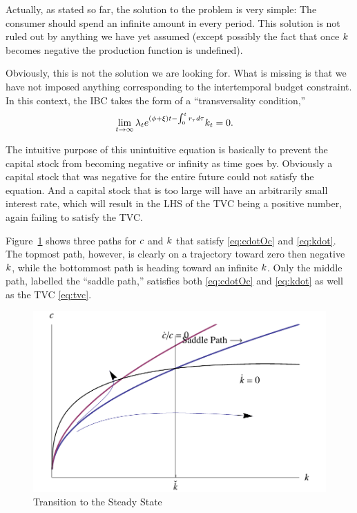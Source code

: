\documentclass{handout}
\begin{document}
Actually, as stated so far, the solution to the problem is very simple: The
consumer should spend an infinite amount in every period.  This solution is 
not ruled out by anything we have yet assumed (except possibly the fact that
once ${k}$ becomes negative the production function is undefined).  

Obviously, this is not the solution we are looking for.  What is missing is
that we have not imposed anything corresponding to the intertemporal 
budget constraint.  In this context, the IBC takes the form of a ``transversality
condition,'' 
\begin{equation}\begin{gathered}\begin{aligned}
  \label{eq:tvc}
  \lim_{t \rightarrow \infty} \lambda_{t} e^{(\phi +\xi) t - \int_{0}^{t} r_{\tau} d\tau }k_{t} & =  0.
\end{aligned}\end{gathered}\end{equation}

The intuitive purpose of this unintuitive equation is basically to prevent
the capital stock from becoming negative or infinity as time goes by.  
Obviously a capital stock that was negative for the entire future could not 
satisfy the equation.  And a capital stock that is too large will have 
an arbitrarily small interest rate, which will result in the LHS of the 
TVC being a positive number, again failing to satisfy the TVC.

Figure~\ref{fig:RamseySaddlePlot} shows three paths for $c$ and ${k}$
that satisfy \eqref{eq:cdotOc} and \eqref{eq:kdot}.  The topmost path,
however, is clearly on a trajectory toward zero then negative
${k}$, while the bottommost path is heading toward an infinite
${k}$.  Only the middle path, labelled the ``saddle path,'' satisfies
both \eqref{eq:cdotOc} and \eqref{eq:kdot} as well as the TVC
\eqref{eq:tvc}.

\begin{figure}
  \caption{Transition to the Steady State}\label{fig:RamseySaddlePlot}
  \includegraphics[width=6in]{../Figures/RamseySaddlePlot}
\end{figure}
\end{document}
